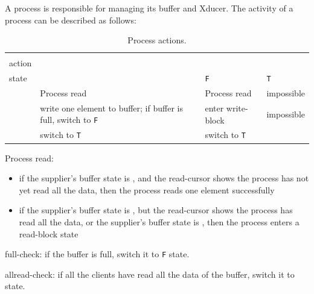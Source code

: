 A process is responsible for managing its buffer and Xducer. 
The activity of a process can be described as follows:


 \begin{table}[H]\large
 	\centering
 	\begin{tabular}{|l|p{}|p{}|l|}  
 		\hline
 		 \diagbox{Xducer \\ action}{Buffer \\ state} & \filling & \draining \texttt{F} & \draining \texttt{T} \\ \hline
 		\pin  & Process read  &  Process read  & impossible \\
 		\hline
 		\pout &  write one element to buffer;
 		if buffer is full, switch to \draining \texttt{F}    &    enter write-block     & impossible \\ 
 		\hline
 		\done &  switch to \draining \texttt{T}      & switch to \draining \texttt{T}   & \skip  \\ 
 		\hline
 	\end{tabular}
 \caption{Process actions. }
 \end{table}

Process read:

\begin{itemize}
	\item if the supplier's buffer state is \draining, and the read-cursor shows the process has not yet read all the data, then the process reads one element successfully
	\item if the supplier's buffer state is \draining, but the read-cursor shows the process has read all the data, or the supplier's buffer state is \filling, then the process enters a read-block state
\end{itemize}

full-check: if the buffer is full, switch it to \draining \texttt{F} state.

allread-check: if all the clients have read all the data of the buffer, switch it to \filling state.


